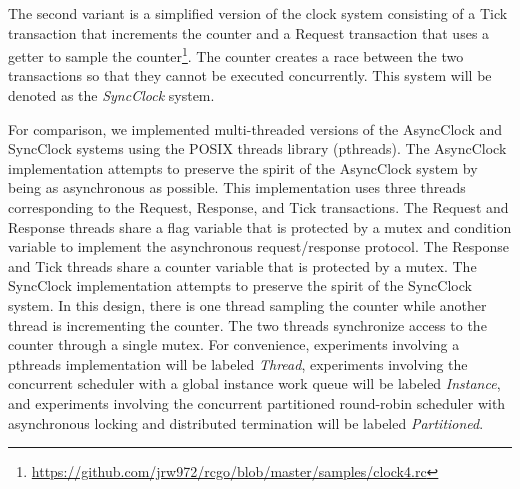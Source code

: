 The second variant is a simplified version of the clock system consisting of a Tick transaction that increments the counter and a Request transaction that uses a getter to sample the counter\footnote{\href{https://github.com/jrw972/rcgo/blob/master/samples/clock4.rc}{https://github.com/jrw972/rcgo/blob/master/samples/clock4.rc}}.
The counter creates a race between the two transactions so that they cannot be executed concurrently.
This system will be denoted as the \emph{SyncClock} system.

For comparison, we implemented multi-threaded versions of the AsyncClock and SyncClock systems using the POSIX threads library (pthreads).
The AsyncClock implementation attempts to preserve the spirit of the AsyncClock system by being as asynchronous as possible.
This implementation uses three threads corresponding to the Request, Response, and Tick transactions.
The Request and Response threads share a flag variable that is protected by a mutex and condition variable to implement the asynchronous request/response protocol.
The Response and Tick threads share a counter variable that is protected by a mutex.
The SyncClock implementation attempts to preserve the spirit of the SyncClock system.
In this design, there is one thread sampling the counter while another thread is incrementing the counter.
The two threads synchronize access to the counter through a single mutex.
For convenience, experiments involving a pthreads implementation will be labeled \emph{Thread}, experiments involving the concurrent scheduler with a global instance work queue will be labeled \emph{Instance}, and experiments involving the concurrent partitioned  round-robin scheduler with asynchronous locking and distributed termination will be labeled \emph{Partitioned}.

